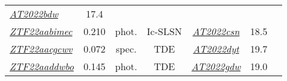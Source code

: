 \begin{table*}[t!]
\begin{tabular}{l  c  c  c  c  c  c}
    \textit{\href{https://www.wis-tns.org/object/2022bdw}{AT2022bdw}}                                 & 17.4           &                                                                                                            \\
    \textit{\href{https://ztfnuclear.simeonreusch.com/transient/ZTF22aabimec}{ZTF22aabimec}}          & 0.210          & phot.          & Ic-SLSN                 &
    \textit{\href{https://www.wis-tns.org/object/2022csn}{AT2022csn}}                                 & 18.5           &                                                                                                            \\
    \textit{\href{https://ztfnuclear.simeonreusch.com/transient/ZTF22aacgcwv}{ZTF22aacgcwv}}          & 0.072          & spec.          & TDE                     &
    \textit{\href{https://www.wis-tns.org/object/2022dyt}{AT2022dyt}}                                 & 19.7           &                                                                                                            \\
    \textit{\href{https://ztfnuclear.simeonreusch.com/transient/ZTF22aaddwbo}{ZTF22aaddwbo}}          & 0.145          & phot.          & TDE                     &
    \textit{\href{https://www.wis-tns.org/object/2022gdw}{AT2022gdw}}                                 & 19.0           &                                                                                                            \\
    \hline
  \end{tabular}
\end{table*}











